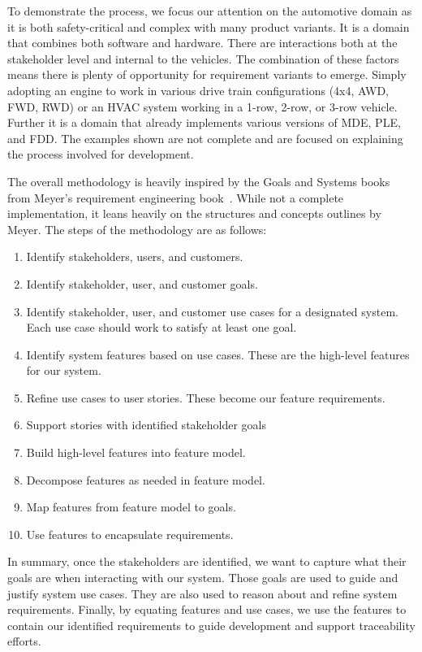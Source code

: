 To demonstrate the process, we focus our attention on the automotive domain as it is both safety-critical and complex with many product variants. It is a domain that combines both software and hardware. There are interactions both at the stakeholder level and internal to the vehicles. The combination of these factors means there is plenty of opportunity for requirement variants to emerge. Simply adopting an engine to work in various drive train configurations (4x4, AWD, FWD, RWD) or an HVAC system working in a 1-row, 2-row, or 3-row vehicle. Further it is a domain that already implements various versions of \ac{MDE}, \ac{PLE}, and \ac{FDD}. The examples shown are not complete and are focused on explaining the process involved for development. 

The overall methodology is heavily inspired by the Goals and Systems books from Meyer's requirement engineering book~\cite{meyer2022handbook}. While not a complete implementation, it leans heavily on the structures and concepts outlines by Meyer. The steps of the methodology are as follows:
\begin{enumerate}
	\item Identify stakeholders, users, and customers.
	\item Identify stakeholder, user, and customer goals.
	\item Identify stakeholder, user, and customer use cases for a designated system. Each use case should work to satisfy at least one goal.
	\item Identify system features based on use cases. These are the high-level features for our system.
	\item Refine use cases to user stories. These become our feature requirements.
	\item Support stories with identified stakeholder goals
	\item Build high-level features into feature model.
	\item Decompose features as needed in feature model.
	\item Map features from feature model to goals.
	\item Use features to encapsulate requirements.
\end{enumerate}

In summary, once the stakeholders are identified, we want to capture what their goals are when interacting with our system. Those goals are used to guide and justify system use cases. They are also used to reason about and refine system requirements. Finally, by equating features and use cases, we use the features to contain our identified requirements to guide development and support traceability efforts.

